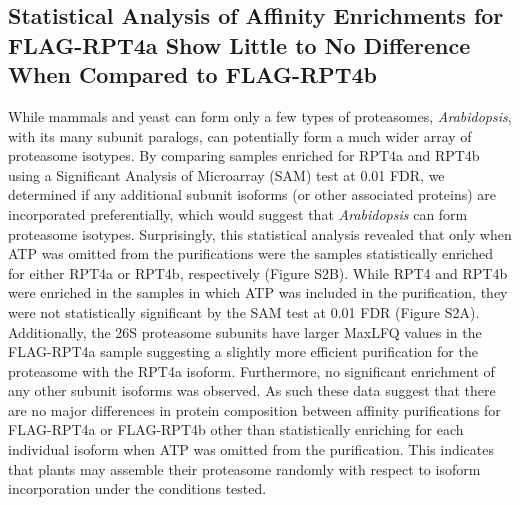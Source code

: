 \subsection{Statistical Analysis of Affinity Enrichments for FLAG-RPT4a Show Little to No Difference When Compared to FLAG-RPT4b}
While mammals and yeast can form only a few types of proteasomes, \textit{Arabidopsis}, with its many subunit paralogs, can potentially form a much wider array of proteasome isotypes. By comparing samples enriched for RPT4a and RPT4b using a Significant Analysis of Microarray (SAM) test at 0.01 FDR, we determined if any additional subunit isoforms (or other associated proteins) are incorporated preferentially, which would suggest that \textit{Arabidopsis} can form proteasome isotypes. Surprisingly, this statistical analysis revealed that only when ATP was omitted from the purifications were the samples statistically enriched for either RPT4a or RPT4b, respectively (Figure S2B). While RPT4 and RPT4b were enriched in the samples in which ATP was included in the purification, they were not statistically significant by the SAM test at 0.01 FDR (Figure S2A). Additionally, the 26S proteasome subunits have larger MaxLFQ values in the FLAG-RPT4a sample suggesting a slightly more efficient purification for the proteasome with the RPT4a isoform. Furthermore, no significant enrichment of any other subunit isoforms was observed. As such these data suggest that there are no major differences in protein composition between affinity purifications for FLAG-RPT4a or FLAG-RPT4b other than statistically enriching for each individual isoform when ATP was omitted from the purification. This indicates that plants may assemble their proteasome randomly with respect to isoform incorporation under the conditions tested. 

